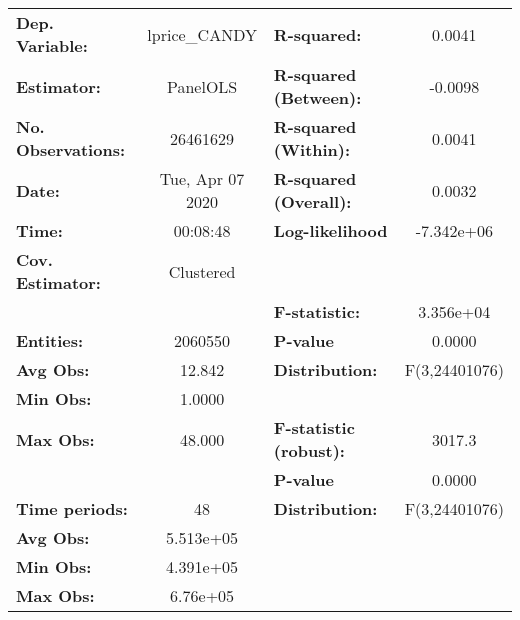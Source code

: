 \documentclass{report}
\begin{document}
\begin{center}
\begin{tabular}{lclc}
\toprule
\textbf{Dep. Variable:}       &   lprice\_CANDY    & \textbf{  R-squared:         }   &      0.0041      \\
\textbf{Estimator:}           &      PanelOLS      & \textbf{  R-squared (Between):}  &     -0.0098      \\
\textbf{No. Observations:}    &      26461629      & \textbf{  R-squared (Within):}   &      0.0041      \\
\textbf{Date:}                &  Tue, Apr 07 2020  & \textbf{  R-squared (Overall):}  &      0.0032      \\
\textbf{Time:}                &      00:08:48      & \textbf{  Log-likelihood     }   &    -7.342e+06    \\
\textbf{Cov. Estimator:}      &     Clustered      & \textbf{                     }   &                  \\
\textbf{}                     &                    & \textbf{  F-statistic:       }   &    3.356e+04     \\
\textbf{Entities:}            &      2060550       & \textbf{  P-value            }   &      0.0000      \\
\textbf{Avg Obs:}             &       12.842       & \textbf{  Distribution:      }   &  F(3,24401076)   \\
\textbf{Min Obs:}             &       1.0000       & \textbf{                     }   &                  \\
\textbf{Max Obs:}             &       48.000       & \textbf{  F-statistic (robust):} &      3017.3      \\
\textbf{}                     &                    & \textbf{  P-value            }   &      0.0000      \\
\textbf{Time periods:}        &         48         & \textbf{  Distribution:      }   &  F(3,24401076)   \\
\textbf{Avg Obs:}             &     5.513e+05      & \textbf{                     }   &                  \\
\textbf{Min Obs:}             &     4.391e+05      & \textbf{                     }   &                  \\
\textbf{Max Obs:}             &      6.76e+05      & \textbf{                     }   &                  \\
\bottomrule
\end{tabular}
\begin{tabular}{lcccccc}

\end{tabular}
\end{center}
\end{document}
